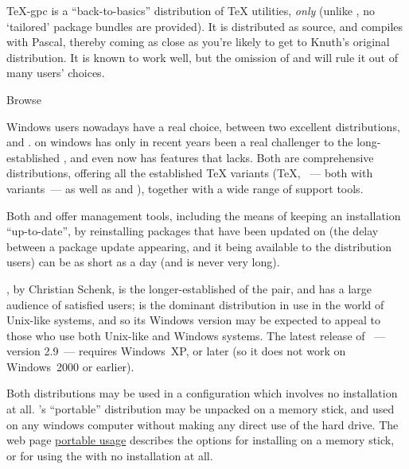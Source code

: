 \TeX{}-gpc is a ``back-to-basics'' distribution of \TeX{} utilities,
\emph{only} (unlike \texlive{}, no `tailored' package bundles are
provided).  It is distributed as source, and compiles with 
Pascal, thereby coming as close as you're likely to get to Knuth's original
distribution.  It is known to work well, but the omission of \eTeX{}
and \pdftex{} will rule it out of many users' choices.
\begin{ctanrefs}
\item[tex-gpc]
\item[texlive]Browse 
\item[texlive installer (Unix)]
\end{ctanrefs}


Windows users nowadays have a real choice, between two excellent
distributions, \miktex{} and \texlive{}.  \texlive{} on windows has
only in recent years been a real challenger to the long-established
\miktex{}, and even now \miktex{} has features that \texlive{} lacks.
Both are comprehensive
distributions, offering all the established \TeX{} variants (\TeX{},
\pdftex{}~--- both with \eTeX{} variants~--- as well as \xetex{} and
\LuaTeX{}), together with a wide range of support tools.
  
Both \miktex{} and \texlive{} offer management tools, including the
means of keeping an installation ``up-to-date'', by reinstalling
packages that have been updated on  (the delay between a
package update appearing, and it being available to the distribution
users) can be as short as a day (and is never very long).

\miktex{}, by Christian Schenk, is the longer-established of the pair,
and has a large audience of satisfied users; \texlive{} is the
dominant distribution in use in the world of Unix-like systems, and so
its Windows version may be expected to appeal to those who use both
Unix-like and Windows systems.  The latest release of \miktex{}~---
version 2.9~--- requires Windows~XP, or later (so it does not work on
Windows~2000 or earlier).

Both distributions may be used in a configuration which involves no
installation at all.  \miktex{}'s ``portable'' distribution may be
unpacked on a memory stick, and used on any windows computer without
making any direct use of the hard drive.  The web page %
\href{http://www.tug.org/texlive/portable.html}{\texlive{} portable usage}
describes the options for installing \texlive{} on a memory stick, or
for using the \texlive{}  with no installation at all.
  
